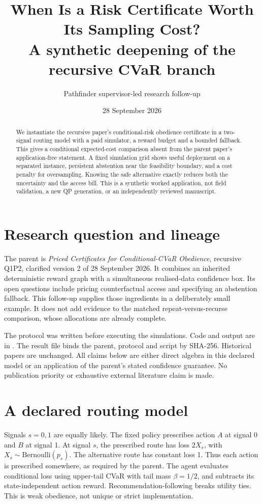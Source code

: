 \documentclass[11pt,a4paper]{article}
\title{When Is a Risk Certificate Worth Its Sampling Cost?\\
\large A synthetic deepening of the recursive CVaR branch}
\author{Pathfinder supervisor-led research follow-up}
\date{28 September 2026}
\begin{document}
\maketitle

\begin{abstract}
We instantiate the recursive paper's conditional-risk obedience certificate
in a two-signal routing model with a paid simulator, a reward budget and a
bounded fallback. This gives a conditional expected-cost comparison absent
from the parent paper's application-free statement. A fixed simulation grid
shows useful deployment on a separated instance, persistent abstention near
the feasibility boundary, and a cost penalty for oversampling. Knowing the
safe alternative exactly reduces both the uncertainty and the access bill.
This is a synthetic worked application, not field validation, a new QP
generation, or an independently reviewed manuscript.
\end{abstract}

\section{Research question and lineage}

The parent is \emph{Priced Certificates for Conditional-CVaR Obedience},
recursive Q1P2, clarified version 2 of 28 September 2026. It combines an
inherited deterministic reward graph with a simultaneous realised-data
confidence box. Its open questions include pricing counterfactual access and
specifying an abstention fallback. This follow-up supplies those ingredients
in a deliberately small example. It does not add evidence to the matched
repeat-versus-recurse comparison, whose allocations are already complete.

The protocol was written before executing the simulations. Code and output
are in . The result file binds
the parent, protocol and script by SHA-256. Historical papers are unchanged.
All claims below are either direct algebra in this declared model or an
application of the parent's stated confidence guarantee. No publication
priority or exhaustive external literature claim is made.

\section{A declared routing model}

Signals \(s=0,1\) are equally likely. The fixed policy prescribes action
\(A\) at signal 0 and \(B\) at signal 1. At signal \(s\), the prescribed
route has loss \(2X_s\), with \(X_s\sim\mathrm{Bernoulli}(p_s)\).
The alternative route has constant loss 1. Thus each action is prescribed
somewhere, as required by the parent. The agent evaluates conditional loss
using upper-tail CVaR with tail mass \(\beta=1/2\), and subtracts its
state-independent action reward. Recommendation-following breaks utility
ties. This is weak obedience, not unique or strict implementation.
\end{document}
